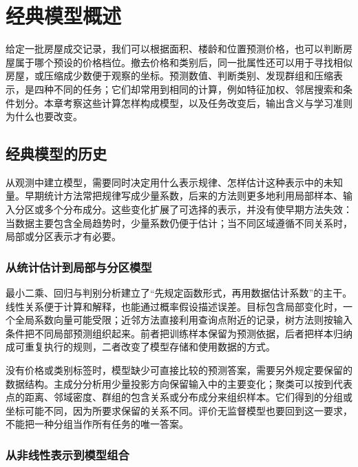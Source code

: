 \chapter{经典模型概述}
\label{chap:classic-models-overview}

给定一批房屋成交记录，我们可以根据面积、楼龄和位置预测价格，也可以判断房屋属于哪个预设的价格档位。撤去价格和类别后，同一批属性还可以用于寻找相似房屋，或压缩成少数便于观察的坐标。预测数值、判断类别、发现群组和压缩表示，是四种不同的任务；它们却常用到相同的计算，例如特征加权、邻居搜索和条件划分。本章考察这些计算怎样构成模型，以及任务改变后，输出含义与学习准则为什么也要改变。

\section{经典模型的历史}
\label{sec:classic-overview-history}

从观测中建立模型，需要同时决定用什么表示规律、怎样估计这种表示中的未知量。早期统计方法常把规律写成少量系数，后来的方法则更多地利用局部样本、输入分区或多个分布成分。这些变化扩展了可选择的表示，并没有使早期方法失效：当数据主要包含全局趋势时，少量系数仍便于估计；当不同区域遵循不同关系时，局部或分区表示才有必要。

\subsection{从统计估计到局部与分区模型}
\label{sec:classic-history-statistical}

最小二乘、回归与判别分析建立了“先规定函数形式，再用数据估计系数”的主干。线性关系便于计算和解释，也能通过概率假设描述误差。目标包含局部变化时，一个全局系数向量可能受限；近邻方法直接利用查询点附近的记录，树方法则按输入条件把不同局部预测组织起来。前者把训练样本保留为预测依据，后者把样本归纳成可重复执行的规则，二者改变了模型存储和使用数据的方式。

没有价格或类别标签时，模型缺少可直接比较的预测答案，需要另外规定要保留的数据结构。主成分分析用少量投影方向保留输入中的主要变化；聚类可以按到代表点的距离、邻域密度、群组的包含关系或分布成分来组织样本。它们得到的分组或坐标可能不同，因为所要求保留的关系不同。评价无监督模型也要回到这一要求，不能把一种分组当作所有任务的唯一答案。

\subsection{从非线性表示到模型组合}
\label{sec:classic-history-kernel-ensemble}

